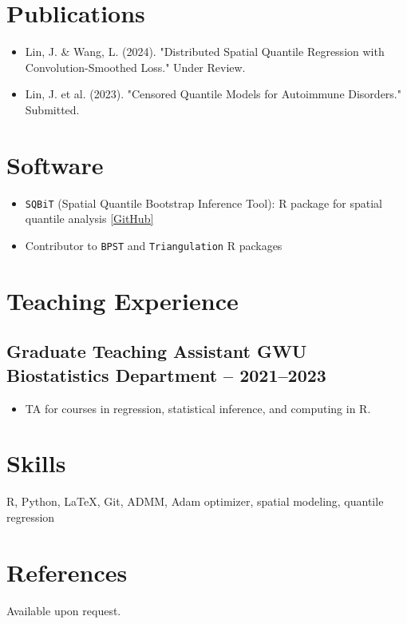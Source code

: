 \documentclass[11pt]{article}
\newcommand{\datedsubsection}[3]{
  \subsection*{#1 \hfill {\small #2 -- #3}}
}
\begin{document}
\section*{Publications}
\begin{itemize}[leftmargin=*]
  \item Lin, J. \& Wang, L. (2024). "Distributed Spatial Quantile Regression with Convolution-Smoothed Loss." Under Review.
  \item Lin, J. et al. (2023). "Censored Quantile Models for Autoimmune Disorders." Submitted.
\end{itemize}

\section*{Software}
\begin{itemize}[leftmargin=*]
  \item \texttt{SQBiT} (Spatial Quantile Bootstrap Inference Tool): R package for spatial quantile analysis \href{https://github.com/jileil2/SQBiT}{[GitHub]}
  \item Contributor to \texttt{BPST} and \texttt{Triangulation} R packages
\end{itemize}

\section*{Teaching Experience}
\datedsubsection{Graduate Teaching Assistant}{GWU Biostatistics Department}{2021--2023}
\begin{itemize}[leftmargin=*]
  \item TA for courses in regression, statistical inference, and computing in R.
\end{itemize}

\section*{Skills}
R, Python, LaTeX, Git, ADMM, Adam optimizer, spatial modeling, quantile regression

\section*{References}
Available upon request.
\end{document}

